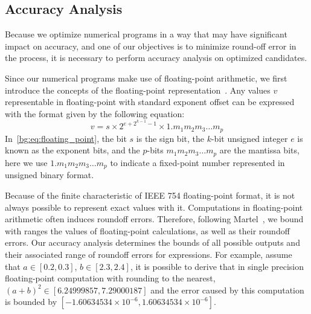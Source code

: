 \subsection{Accuracy Analysis}
\label{bg:sub:accuracy}

Because we optimize numerical programs in a way that may have significant
impact on accuracy, and one of our objectives is to minimize round-off error
in the process, it is necessary to perform accuracy analysis on optimized
candidates.

Since our numerical programs make use of floating-point arithmetic, we first
introduce the concepts of the floating-point representation~\cite{ieee754}. Any
values $v$ representable in floating-point with standard exponent offset can be
expressed with the format given by the following equation:
\begin{equation}
    v = s \times 2^{e + 2^{k - 1} - 1} \times 1.{m_1 m_2 m_3 \ldots m_p}
    \label{bg:eq:floating_point}
\end{equation}
In~\eqref{bg:eq:floating_point}, the bit $s$ is the sign bit, the $k$-bit
unsigned integer $e$ is known as the exponent bits, and the $p$-bits $m_1 m_2
m_3 \ldots m_p$ are the mantissa bits, here we use $1.{m_1 m_2 m_3 \ldots m_p}$
to indicate a fixed-point number represented in unsigned binary format.

Because of the finite characteristic of IEEE 754 floating-point format, it
is not always possible to represent exact values with it. Computations in
floating-point arithmetic often induces roundoff errors. Therefore, following
Martel~\cite{martel07}, we bound with ranges the values of floating-point
calculations, as well as their roundoff errors. Our accuracy analysis
determines the bounds of all possible outputs and their associated range
of roundoff errors for expressions. For example, assume that $a \in [0.2,
0.3]$, $b \in [2.3, 2.4]$, it is possible to derive that in single precision
floating-point computation with rounding to the nearest, ${(a + b)}^2 \in
[6.24999857, 7.29000187]$ and the error caused by this computation is bounded
by $[-1.60634534\times10^{-6}, 1.60634534\times10^{-6}]$.

